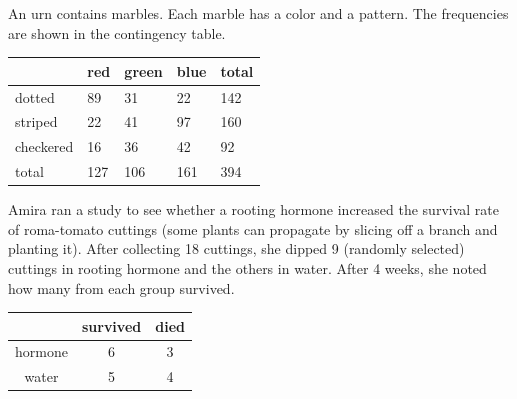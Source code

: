 \documentclass[12pt,letterpaper,addpoints]{exam}
\begin{document}
\newpage
{}
\begin{questions}

\question[10] An urn contains marbles. Each marble has a color and a pattern. The frequencies are shown in the contingency table.
\begin{center}
\begin{tabularx}{0.6\textwidth}{|Y|Y Y Y|Y|}\hline
          & red & green & blue & total\\ \hline
dotted    & 89  & 31    & 22  & 142 \\
striped   & 22 & 41 & 97 & 160 \\
checkered & 16 & 36 & 42 & 92  \\ \hline
total & 127 & 106 & 161& 394 \\ \hline
\end{tabularx}
\end{center}

\newpage

\question[10] Amira ran a study to see whether a rooting hormone increased the survival rate of roma-tomato cuttings (some plants can propagate by slicing off a branch and planting it). After collecting 18 cuttings, she dipped 9 (randomly selected) cuttings in rooting hormone and the others in water. After 4 weeks, she noted how many from each group survived.
\begin{center}
\begin{tabular}{c|c c}
& survived & died \\ \hline
hormone & 6 & 3 \\
water & 5 & 4 \\
\end{tabular}
\end{center}
\begin{parts}

\end{parts}
\end{questions}
\end{document}
